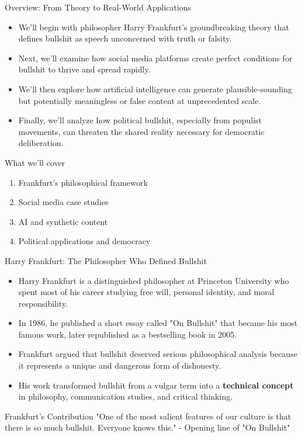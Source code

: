 \documentclass{beamer}
\begin{document}
	\begin{frame}{Overview: From Theory to Real-World Applications}
		\begin{itemize}
			\item We'll begin with philosopher Harry Frankfurt's groundbreaking theory that defines bullshit as speech unconcerned with truth or falsity.
			\item Next, we'll examine how social media platforms create perfect conditions for bullshit to thrive and spread rapidly.
			\item We'll then explore how artificial intelligence can generate plausible-sounding but potentially meaningless or false content at unprecedented scale.
			\item Finally, we'll analyze how political bullshit, especially from populist movements, can threaten the shared reality necessary for democratic deliberation.
		\end{itemize}
		
		\begin{block}{What we'll cover}
			\begin{enumerate}
				\item Frankfurt's philosophical framework
				\item Social media case studies
				\item AI and synthetic content
				\item Political applications and democracy
			\end{enumerate}
		\end{block}
	\end{frame}
	
	\begin{frame}{Harry Frankfurt: The Philosopher Who Defined Bullshit}
		\begin{itemize}
			\item Harry Frankfurt is a distinguished philosopher at Princeton University who spent most of his career studying free will, personal identity, and moral responsibility.
			\item In 1986, he published a short essay called "On Bullshit" that became his most famous work, later republished as a bestselling book in 2005.
			\item Frankfurt argued that bullshit deserved serious philosophical analysis because it represents a unique and dangerous form of dishonesty.
			\item His work transformed bullshit from a vulgar term into a \textbf{technical concept} in philosophy, communication studies, and critical thinking.
		\end{itemize}
		
		\begin{block}{Frankfurt's Contribution}
			"One of the most salient features of our culture is that there is so much bullshit. Everyone knows this." - Opening line of "On Bullshit"
		\end{block}
	\end{frame}
	
\end{document}
